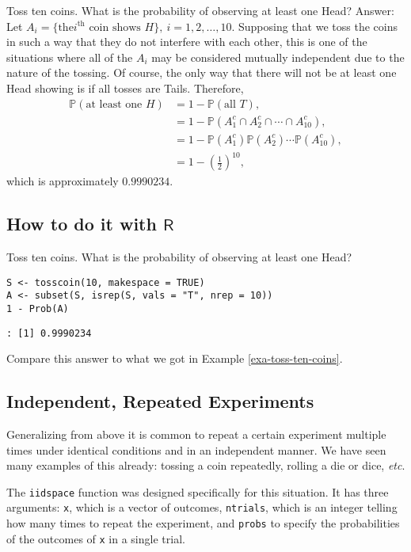 \label{exa-toss-ten-coins} Toss ten coins. What is the probability of
observing at least one Head? Answer: Let \(A_{i}= \{ \mbox{the
}i^{\mathrm{th}}\mbox{ coin shows }H \} ,\
i=1,2,\ldots,10\). Supposing that we toss the coins in such a way that
they do not interfere with each other, this is one of the situations
where all of the \(A_{i}\) may be considered mutually independent due
to the nature of the tossing. Of course, the only way that there will
not be at least one Head showing is if all tosses are
Tails. Therefore,
\begin{align*}
\mathbb{P}(\mbox{at least one }H) & =1-\mathbb{P}(\mbox{all }T),\\
 & =1-\mathbb{P}(A_{1}^{c}\cap A_{2}^{c}\cap\cdots\cap A_{10}^{c}),\\
 & =1-\mathbb{P}(A_{1}^{c})\mathbb{P}(A_{2}^{c})\cdots\mathbb{P}(A_{10}^{c}),\\
 & =1-\left(\frac{1}{2}\right)^{10},
\end{align*}
which is approximately \(0.9990234\).

\subsection{How to do it with \(\mathsf{R}\)}
\label{sec-4-7-1}


Toss ten coins. What is the probability of observing at least one
Head?

\begin{verbatim}
S <- tosscoin(10, makespace = TRUE)
A <- subset(S, isrep(S, vals = "T", nrep = 10))
1 - Prob(A)
\end{verbatim}

\begin{verbatim}
: [1] 0.9990234
\end{verbatim}

Compare this answer to what we got in Example \ref{exa-toss-ten-coins}.

\subsection{Independent, Repeated Experiments}
\label{sec-4-7-2}

Generalizing from above it is common to repeat a certain experiment
multiple times under identical conditions and in an independent
manner. We have seen many examples of this already: tossing a coin
repeatedly, rolling a die or dice, \emph{etc}.

The \texttt{iidspace} function was designed specifically for this
situation. It has three arguments: \texttt{x}, which is a vector of outcomes,
\texttt{ntrials}, which is an integer telling how many times to repeat the
experiment, and \texttt{probs} to specify the probabilities of the outcomes
of \texttt{x} in a single trial.


